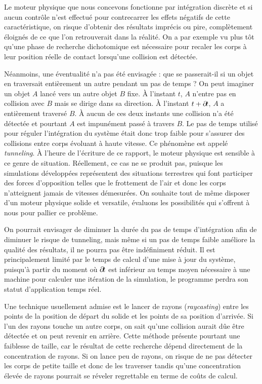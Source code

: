 Le moteur physique que nous concevons fonctionne par intégration
discrète et si aucun contrôle n'est effectué pour contrecarrer les
effets négatifs de cette caractéristique, on risque d'obtenir des
résultats imprécis ou pire, complètement éloignés de ce que l'on
retrouverait dans la réalité. On a par exemple vu plus tôt qu'une
phase de recherche dichotomique est nécessaire pour recaler les corps
à leur position réelle de contact lorsqu'une collision est détectée.

Néanmoins, une éventualité n'a pas été envisagée : que se passerait-il
si un objet en traversait entièrement un autre pendant un pas de temps
? On peut imaginer un objet $A$ lancé vers un autre objet $B$
fixe. \`A l'instant $t$, $A$ n'entre pas en collision avec $B$ mais se
dirige dans sa direction. \`A l'instant $t + \partial \! t$, $A$ a
entièrement traversé $B$. \`A aucun de ces deux instants une collision
n'a été détectée et pourtant $A$ est impunément passé à travers
$B$. Le pas de temps utilisé pour réguler l'intégration du système
était donc trop faible pour s'assurer des collisions entre corps
évoluant à haute vitesse. Ce phénomène est appelé
\textit{tunneling}. \`A l'heure de l'écriture de ce rapport, le moteur
physique est sensible à ce genre de situation. Réellement, ce cas ne
se produit pas, puisque les simulations développées représentent des
situations terrestres qui font participer des forces d'opposition
telles que le frottement de l'air et donc les corps n'atteignent
jamais de vitesses démesurées. On souhaite tout de même disposer d'un
moteur physique solide et versatile, évaluons les possibilités qui
s'offrent à nous pour pallier ce problème.

\begin{figure}
  \centering
  
  \caption{}
  \label{tunneling1}
\end{figure}

On pourrait envisager de diminuer la durée du pas de temps
d'intégration afin de diminuer le risque de tunneling, mais même si un
pas de temps faible améliore la qualité des résultats, il ne pourra
pas être indéfiniment réduit. Il est principalement limité par le
temps de calcul d'une mise à jour du système, puisqu'à partir du
moment o\`u $\partial \! t$ est inférieur au temps moyen nécessaire à une
machine pour calculer une itération de la simulation, le programme
perdra son statut d'application temps réel.

Une technique usuellement admise est le lancer de rayons
(\textit{raycasting}) entre les points de la position de départ du
solide et les points de sa position d'arrivée. Si l'un des rayons
touche un autre corps, on sait qu'une collision aurait dûe être
détectée et on peut revenir en arrière. Cette méthode présente
pourtant une faiblesse de taille, car le résultat de cette recherche
dépend directement de la concentration de rayons. Si on lance peu de
rayons, on risque de ne pas détecter les corps de petite taille et
donc de les traverser tandis qu'une concentration élevée de rayons
pourrait se réveler regrettable en terme de coûts de calcul.

